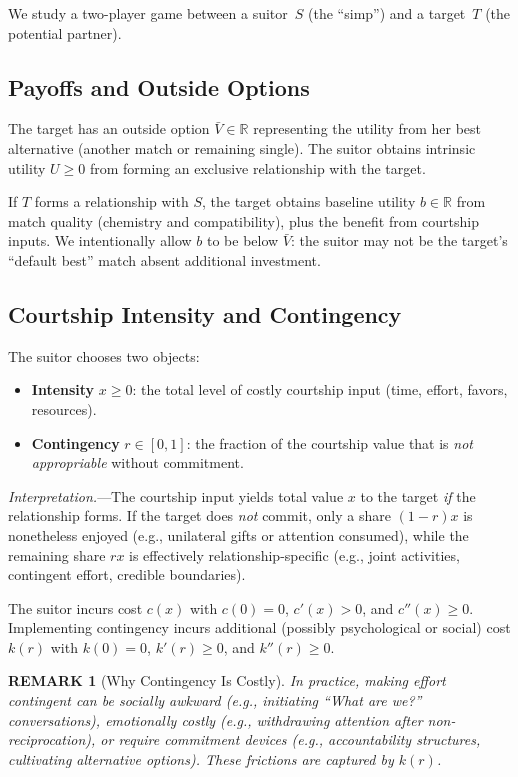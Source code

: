 \documentclass[AER]{AEA}
\newtheorem{remark}{REMARK}
\begin{document}
We study a two-player game between a suitor~$S$ (the ``simp'') and a target~$T$ (the potential partner).

\subsection{Payoffs and Outside Options}

The target has an outside option $\bar{V} \in \mathbb{R}$ representing the utility from her best alternative (another match or remaining single).
The suitor obtains intrinsic utility $U \ge 0$ from forming an exclusive relationship with the target.

If $T$ forms a relationship with $S$, the target obtains baseline utility $b \in \mathbb{R}$ from match quality (chemistry and compatibility), plus the benefit from courtship inputs.
We intentionally allow $b$ to be below $\bar{V}$: the suitor may not be the target's ``default best'' match absent additional investment.

\subsection{Courtship Intensity and Contingency}

The suitor chooses two objects:

\begin{itemize}[leftmargin=0.75in]
\item \textbf{Intensity} $x \ge 0$: the total level of costly courtship input (time, effort, favors, resources).
\item \textbf{Contingency} $r \in [0,1]$: the fraction of the courtship value that is \emph{not appropriable} without commitment.
\end{itemize}

\noindent
\emph{Interpretation.}---The courtship input yields total value $x$ to the target \emph{if} the relationship forms.
If the target does \emph{not} commit, only a share $(1-r)x$ is nonetheless enjoyed (e.g., unilateral gifts or attention consumed),
while the remaining share $rx$ is effectively relationship-specific (e.g., joint activities, contingent effort, credible boundaries).

The suitor incurs cost $c(x)$ with $c(0)=0$, $c'(x)>0$, and $c''(x)\ge 0$.
Implementing contingency incurs additional (possibly psychological or social) cost $k(r)$ with $k(0)=0$, $k'(r)\ge 0$, and $k''(r)\ge 0$.

\begin{remark}[Why Contingency Is Costly]
In practice, making effort contingent can be socially awkward (e.g., initiating ``What are we?'' conversations), emotionally costly (e.g., withdrawing attention after non-reciprocation), or require commitment devices (e.g., accountability structures, cultivating alternative options).
These frictions are captured by $k(r)$.
\end{remark}
\end{document}
